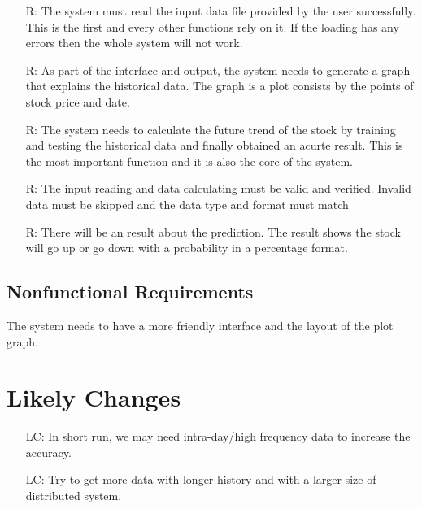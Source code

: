 \documentclass[12pt]{article}
\newcounter{reqnum} %
\newcounter{lcnum} %
\begin{document}
\noindent \begin{itemize}

\item[R\refstepcounter{reqnum}\thereqnum \label{R_Inputs}:] The system must read the input data file provided by the user successfully. This is the first and every other functions rely on it. If the loading has any errors then the whole system will not work. 

\item[R\refstepcounter{reqnum}\thereqnum \label{R_OutputInputs}:] As part of the interface and output, the system needs to generate a graph that explains  the historical data. The graph is a plot consists by the points of stock price and date.  


\item[R\refstepcounter{reqnum}\thereqnum \label{R_Calculate}:] The system needs to calculate the future trend of the stock by training and testing the historical data and finally obtained an acurte result. This is the most important function and it is also the core of the system.

\item[R\refstepcounter{reqnum}\thereqnum \label{R_VerifyOutput}:] The input reading and data calculating must be valid and verified. Invalid data must be skipped and the data type and format must match

\item[R\refstepcounter{reqnum}\thereqnum \label{R_Output}:]  There will be an result about the prediction. The result shows the stock will go up or go down with a probability in a percentage format.
\end{itemize}


\subsection{Nonfunctional Requirements}

The system needs to have a more friendly interface and the layout of the plot
graph. 

\section{Likely Changes}    

\noindent \begin{itemize}

\item[LC\refstepcounter{lcnum}\thelcnum\label{LC1}:] In short run, we may need intra-day/high frequency data to increase the accuracy.
\item[LC\refstepcounter{lcnum}\thelcnum\label{LC2}:] Try to get more data with longer history and with a larger size of distributed system.
\end{itemize}
\end{document}
